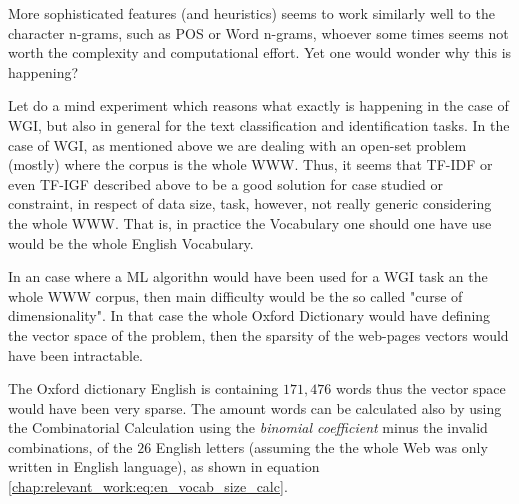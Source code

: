 More sophisticated features (and heuristics) seems to work similarly well to the character n-grams, such as POS or Word n-grams, whoever some times seems not worth the complexity and computational effort. Yet one would wonder why this is happening?

Let do a mind experiment which reasons what exactly is happening in the case of WGI, but also in general for the text classification and identification tasks. In the case of WGI, as mentioned above we are dealing with an open-set problem (mostly) where the corpus is the whole WWW. Thus, it seems that TF-IDF or even TF-IGF described above to be a good solution for case studied or constraint, in respect of data size, task, however, not really generic considering the whole WWW. That is, in practice the Vocabulary one should one have use would be the whole English Vocabulary.

In an case where a ML algorithn would have been used for a WGI task an the whole WWW corpus, then main difficulty would be the so called "curse of dimensionality". In that case the whole Oxford Dictionary would have defining the vector space of the problem, then the sparsity of the web-pages vectors would have been intractable. 

The Oxford dictionary English is containing $171,476$ words thus the vector space would have been very sparse. The amount words can be calculated also by using the Combinatorial Calculation using the \textit{binomial coefficient} minus the invalid combinations, of the $26$ English letters (assuming the the whole Web was only written in English language), as shown in equation \ref{chap:relevant_work:eq:en_vocab_size_calc}.

